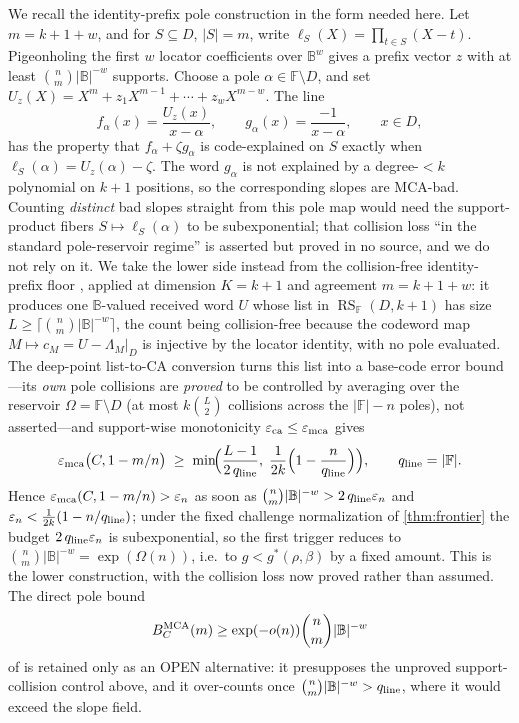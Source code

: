 \documentclass[11pt,a4paper]{amsart}
\numberwithin{equation}{section}
\theoremstyle{remark}
\DeclareMathOperator{\RS}{RS}
\newcommand{\F}{\mathbb F}
\newcommand{\B}{\mathbb B}
\newcommand{\eps}{\varepsilon}
\begin{document}
We recall the identity-prefix pole construction in the form needed here.  Let \(m=k+1+w\), and for \(S\subseteq D\), \(|S|=m\), write \(\ell_S(X)=\prod_{t\in S}(X-t)\).  Pigeonholing the first \(w\) locator coefficients over \(\B^w\) gives a prefix vector \(z\) with at least \(\binom nm|\B|^{-w}\) supports.  Choose a pole \(\alpha\in\F\setminus D\), and set \(U_z(X)=X^m+z_1X^{m-1}+\cdots+z_wX^{m-w}\).  The line
\[
        f_\alpha(x)=\frac{U_z(x)}{x-\alpha},
        \qquad
        g_\alpha(x)=\frac{-1}{x-\alpha},
        \qquad x\in D,
\]
has the property that \(f_\alpha+\zeta g_\alpha\) is code-explained on \(S\) exactly when \(\ell_S(\alpha)=U_z(\alpha)-\zeta\).  The word \(g_\alpha\) is not explained by a degree-\(<k\) polynomial on \(k+1\) positions, so the corresponding slopes are MCA-bad.  Counting \emph{distinct} bad slopes straight from this pole map would need the support-product fibers \(S\mapsto\ell_S(\alpha)\) to be subexponential; that collision loss ``in the standard pole-reservoir regime'' is asserted but proved in no source, and we do not rely on it.  We take the lower side instead from the collision-free identity-prefix floor \cite[Lemma ``identity-scale prefix floor'' (\texttt{lem:capff1-identity-prefix-floor})]{Cho26CapV13}, applied at dimension \(K=k+1\) and agreement \(m=k+1+w\): it produces one \(\B\)-valued received word \(U\) whose list in \(\RS_\F(D,k+1)\) has size \(L\ge\lceil\binom nm|\B|^{-w}\rceil\), the count being collision-free because the codeword map \(M\mapsto c_M=U-\Lambda_M|_D\) is injective by the locator identity, with no pole evaluated.  The deep-point list-to-CA conversion \cite[Theorem ``deep-point list-to-CA conversion'' (\texttt{thm:A}), taken at \(\eta=\tfrac12\)]{Cho26CapV13} turns this list into a base-code error bound---its \emph{own} pole collisions are \emph{proved} to be controlled by averaging over the reservoir \(\Omega=\F\setminus D\) \textup{(at most \(k\binom L2\) collisions across the \(|\F|-n\) poles)}, not asserted---and support-wise monotonicity \(\eps_{\rm ca}\le\eps_{\rm mca}\) gives
\[
        \eps_{\rm mca}\bigl(C,1-m/n\bigr)
        \;\ge\;
        \min\!\Bigl(\frac{L-1}{2\,q_{\rm line}},\;\frac1{2k}\Bigl(1-\frac n{q_{\rm line}}\Bigr)\Bigr),
        \qquad q_{\rm line}=|\F| .
\]
Hence \(\eps_{\rm mca}(C,1-m/n)>\eps_n\) as soon as \(\binom nm|\B|^{-w}>2\,q_{\rm line}\eps_n\) and \(\eps_n<\tfrac1{2k}(1-n/q_{\rm line})\); under the fixed challenge normalization of \cref{thm:frontier} the budget \(2\,q_{\rm line}\eps_n\) is subexponential, so the first trigger reduces to \(\binom nm|\B|^{-w}=\exp(\Omega(n))\), i.e.\ to \(g<g^*(\rho,\beta)\) by a fixed amount.  This is the lower construction, with the collision loss now proved rather than assumed.  The direct pole bound
\[
        B_C^{\rm MCA}(m)\ge \exp(-o(n))\binom nm|\B|^{-w}
\]
of \cite{Cho26CapV13,Cho26Grande} is retained only as an \textup{OPEN} alternative: it presupposes the unproved support-collision control above, and it over-counts once \(\binom nm|\B|^{-w}>q_{\rm line}\), where it would exceed the slope field.
\end{document}
